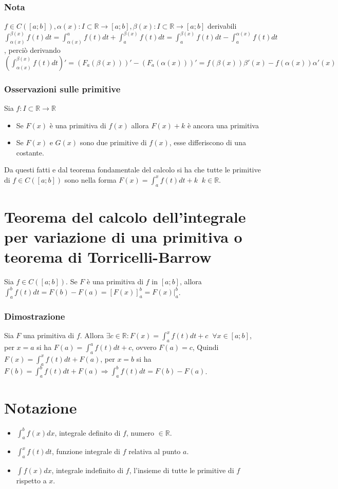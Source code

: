 \subsubsection{Nota}
$f\in C([a;b]), \alpha(x):I\subset\mathbb{R}\rightarrow[a;b], \beta(x):I\subset\mathbb{R}\rightarrow[a;b]$ derivabili $\int_{\alpha(x)}^{\beta(x)}f(t)dt=\int_{\alpha(x)}^a f(t)dt
+\int_a^{\beta(x)}f(t)dt=\int_a^{\beta(x)}f(t)dt-\int_a^{\alpha(x)}f(t)dt$, perci\`o derivando $(\int_{\alpha(x)}^{\beta(x)}f(t)dt)'=(F_a(\beta(x)))'-
(F_a(\alpha(x)))'=f(\beta(x))\beta'(x)-f(\alpha(x))\alpha'(x)$
\subsubsection{Osservazioni sulle primitive}
Sia $f:I\subset\mathbb{R}\rightarrow\mathbb{R}$
\begin{itemize}
\item Se $F(x)$ \`e una primitiva di $f(x)$ allora $F(x)+k$ \`e ancora una primitiva
\item Se $F(x)$ e $G(x)$ sono due primitive di $f(x)$, esse differiscono di una costante.%
\end{itemize}
Da questi fatti e dal teorema fondamentale del calcolo si ha che tutte le primitive di $f\in C([a;b])$ sono nella forma $F(x)=\int_a^xf(t)dt+k\;\;k\in\mathbb{R}$.
\section{Teorema del calcolo dell'integrale per variazione di una primitiva o teorema di Torricelli-Barrow}
Sia $f\in C([a;b])$. Se $F$ \`e una primitiva di $f$ in $[a;b]$, allora $\int_a^bf(t)dt=F(b)-F(a)=[F(x)]^b_a=F(x)|_a^b$.
\subsubsection{Dimostrazione}
Sia $F$ una primitiva di $f$. Allora $\exists c\in\mathbb{R}:F(x)=\int_a^xf(t)dt+c\;\;\forall x\in[a;b]$, per $x=a$ si ha $F(a)=\int_a^af(t)dt+c$, ovvero $F(a)=c$, Quindi 
$F(x)=\int_a^xf(t)dt+F(a)$, per $x=b$ si ha $F(b)=\int_a^bf(t)dt+F(a)\Rightarrow\int_a^bf(t)dt=F(b)-F(a)$.
\section{Notazione}
\begin{itemize}
\item $\int_a^bf(x)dx$, integrale definito di $f$, numero $\in\mathbb{R}$.
\item $\int_a^xf(t)dt$, funzione integrale di $f$ relativa al punto $a$.
\item $\int f(x)dx$, integrale indefinito di $f$, l'insieme di tutte le primitive di $f$ rispetto a $x$.
\end{itemize}
